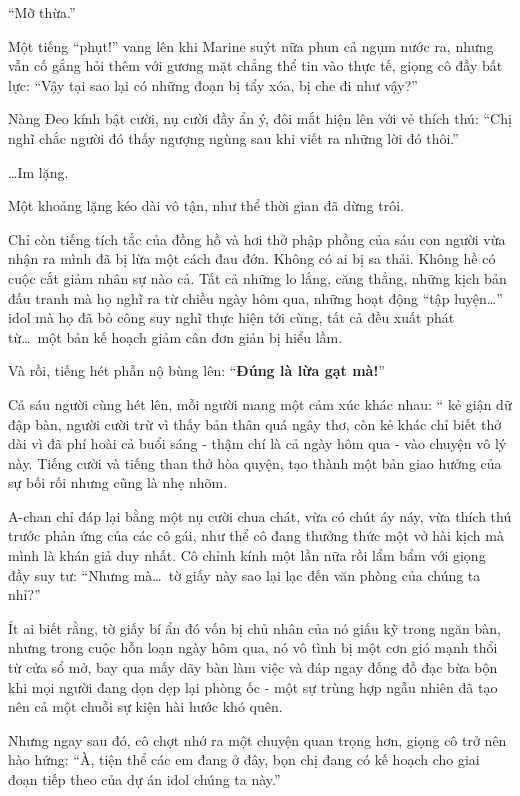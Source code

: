 \documentclass[../main.tex]{subfiles}
\begin{document}
``Mỡ thừa.''

Một tiếng ``phụt!'' vang lên khi Marine suýt nữa phun cả ngụm nước ra, nhưng vẫn cố gắng hỏi thêm với gương mặt chẳng thể tin vào thực tế, giọng cô đầy bất lực: ``Vậy tại sao lại có những đoạn bị tẩy xóa, bị che đi như vậy?''

Nàng Đeo kính bật cười, nụ cười đầy ẩn ý, đôi mắt hiện lên với vẻ thích thú: ``Chị nghĩ chắc người đó thấy ngượng ngùng sau khi viết ra những lời đó thôi.''

\dots Im lặng.

Một khoảng lặng kéo dài vô tận, như thể thời gian đã dừng trôi.

Chỉ còn tiếng tích tắc của đồng hồ và hơi thở phập phồng của sáu con người vừa nhận ra mình đã bị lừa một cách đau đớn. Không có ai bị sa thải. Không hề có cuộc cắt giảm nhân sự nào cả. Tất cả những lo lắng, căng thẳng, những kịch bản đấu tranh mà họ nghĩ ra từ chiều ngày hôm qua, những hoạt động ``tập luyện\dots'' idol mà họ đã bỏ công suy nghĩ thực hiện tới cùng, tất cả đều xuất phát từ\dots\ một bản kế hoạch giảm cân đơn giản bị hiểu lầm.

Và rồi, tiếng hét phẫn nộ bùng lên: ``\textbf{Đúng là lừa gạt mà!}''


Cả sáu người cùng hét lên, mỗi người mang một cảm xúc khác nhau: `` kẻ giận dữ đập bàn, người cười trừ vì thấy bản thân quá ngây thơ, còn kẻ khác chỉ biết thở dài vì đã phí hoài cả buổi sáng - thậm chí là cả ngày hôm qua - vào chuyện vô lý này. Tiếng cười và tiếng than thở hòa quyện, tạo thành một bản giao hưởng của sự bối rối nhưng cũng là nhẹ nhõm.

A-chan chỉ đáp lại bằng một nụ cười chua chát, vừa có chút áy náy, vừa thích thú trước phản ứng của các cô gái, như thể cô đang thưởng thức một vở hài kịch mà mình là khán giả duy nhất. Cô chỉnh kính một lần nữa rồi lẩm bẩm với giọng đầy suy tư: ``Nhưng mà\dots\ tờ giấy này sao lại lạc đến văn phòng của chúng ta nhỉ?''

Ít ai biết rằng, tờ giấy bí ẩn đó vốn bị chủ nhân của nó giấu kỹ trong ngăn bàn, nhưng trong cuộc hỗn loạn ngày hôm qua, nó vô tình bị một cơn gió mạnh thổi từ cửa sổ mở, bay qua mấy dãy bàn làm việc và đáp ngay đống đồ đạc bừa bộn khi mọi người đang dọn dẹp lại phòng ốc - một sự trùng hợp ngẫu nhiên đã tạo nên cả một chuỗi sự kiện hài hước khó quên.

Nhưng ngay sau đó, cô chợt nhớ ra một chuyện quan trọng hơn, giọng cô trở nên hào hứng: ``À, tiện thể các em đang ở đây, bọn chị đang có kế hoạch cho giai đoạn tiếp theo của dự án idol chúng ta này.''
\end{document}
